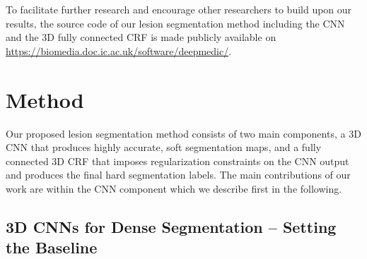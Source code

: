 \documentclass[preprint,authoryear,12pt]{elsarticle}
\begin{document}
To facilitate further research and encourage other researchers to build upon our results, the source code of our lesion segmentation method including the CNN and the 3D fully connected CRF is made publicly available on \url{https://biomedia.doc.ic.ac.uk/software/deepmedic/}.

 


\section{Method}
\label{sec:segmentationSystem}

Our proposed lesion segmentation method consists of two main components, a 3D CNN that produces highly accurate, soft segmentation maps, and a fully connected 3D CRF that imposes regularization constraints on the CNN output and produces the final hard segmentation labels. The main contributions of our work are within the CNN component which we describe first in the following.

\subsection{3D CNNs for Dense Segmentation -- Setting the Baseline}
\label{subsec:theBaseline}
\end{document}
